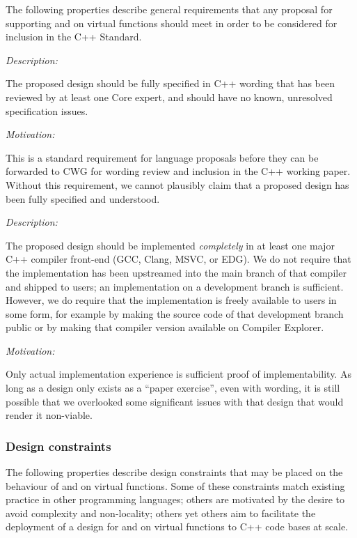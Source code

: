 The following properties describe general requirements that any proposal for supporting  and  on virtual functions should meet in order to be considered for inclusion in the C++ Standard.


\emph{Description:}

The proposed design should be fully specified in C++ wording that has been reviewed by at least one Core expert, and should have no known, unresolved specification issues.

\emph{Motivation:}

 This is a standard requirement for language proposals before they can be forwarded to CWG for wording review and inclusion in the C++ working paper.  Without this requirement, we cannot plausibly claim that a proposed design has been fully specified and understood.


\emph{Description:}

The proposed design should be implemented \emph{completely} in at least one major C++ compiler front-end (GCC, Clang, MSVC, or EDG). We do not require that the implementation has been upstreamed into the main branch of that compiler and shipped to users; an implementation on a development branch is sufficient. However, we do require that the implementation is freely available to users in some form, for example by making the source code of that development branch public or by making that compiler version available on Compiler Explorer.

\emph{Motivation:}

Only actual implementation experience is sufficient proof of implementability. As long as a design only exists as a ``paper exercise'', even with wording, it is still possible that we overlooked some significant issues with that design that would render it non-viable.


\subsubsection{Design constraints}

The following properties describe design constraints that may be placed on the behaviour of  and  on virtual functions. Some of these constraints match existing practice in other programming languages; others are motivated by the desire to avoid complexity and non-locality; others yet others aim to facilitate the deployment of a design for  and  on virtual functions to C++ code bases at scale.

